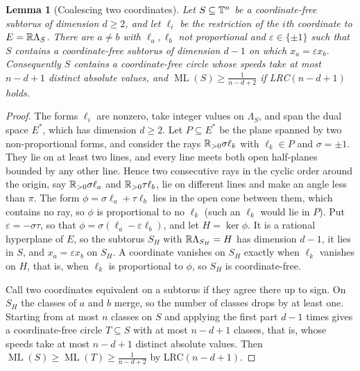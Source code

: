 \documentclass[12pt]{amsart}
\newtheorem{lemma}[theorem]{Lemma}
\theoremstyle{definition}\newtheorem{definition}[theorem]{Definition}
\theoremstyle{remark}\newtheorem{remark}[theorem]{Remark}
\newcommand{\ML}{\operatorname{ML}}
\begin{document}
\begin{lemma}[Coalescing two coordinates]\label{lem:coalesce}
Let $S\subseteq\mathbb T^n$ be a coordinate-free subtorus of dimension $d\ge2$, and let $\ell_i$ be the restriction of the $i$th coordinate to $E=\mathbb R\Lambda_S$. There are $a\ne b$ with $\ell_a,\ell_b$ not proportional and $\varepsilon\in\{\pm1\}$ such that $S$ contains a coordinate-free subtorus of dimension $d-1$ on which $x_a=\varepsilon x_b$. Consequently $S$ contains a coordinate-free circle whose speeds take at most $n-d+1$ distinct absolute values, and $\ML(S)\ge\frac1{n-d+2}$ if LRC$(n-d+1)$ holds.
\end{lemma}
\begin{proof}
The forms $\ell_i$ are nonzero, take integer values on $\Lambda_S$, and span the dual space $E^*$, which has dimension $d\ge2$. Let $P\subseteq E^*$ be the plane spanned by two non-proportional forms, and consider the rays $\mathbb R_{>0}\sigma\ell_k$ with $\ell_k\in P$ and $\sigma=\pm1$. They lie on at least two lines, and every line meets both open half-planes bounded by any other line. Hence two consecutive rays in the cyclic order around the origin, say $\mathbb R_{>0}\sigma\ell_a$ and $\mathbb R_{>0}\tau\ell_b$, lie on different lines and make an angle less than $\pi$. The form $\phi=\sigma\ell_a+\tau\ell_b$ lies in the open cone between them, which contains no ray, so $\phi$ is proportional to no $\ell_k$ (such an $\ell_k$ would lie in $P$). Put $\varepsilon=-\sigma\tau$, so that $\phi=\sigma(\ell_a-\varepsilon\ell_b)$, and let $H=\ker\phi$. It is a rational hyperplane of $E$, so the subtorus $S_H$ with $\mathbb R\Lambda_{S_H}=H$ has dimension $d-1$, it lies in $S$, and $x_a=\varepsilon x_b$ on $S_H$. A coordinate vanishes on $S_H$ exactly when $\ell_k$ vanishes on $H$, that is, when $\ell_k$ is proportional to $\phi$, so $S_H$ is coordinate-free.

Call two coordinates equivalent on a subtorus if they agree there up to sign. On $S_H$ the classes of $a$ and $b$ merge, so the number of classes drops by at least one. Starting from at most $n$ classes on $S$ and applying the first part $d-1$ times gives a coordinate-free circle $T\subseteq S$ with at most $n-d+1$ classes, that is, whose speeds take at most $n-d+1$ distinct absolute values. Then $\ML(S)\ge\ML(T)\ge\frac1{n-d+2}$ by LRC$(n-d+1)$.
\end{proof}
\end{document}
